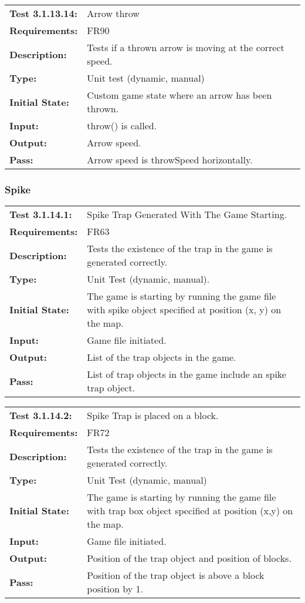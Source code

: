 \documentclass[12pt, titlepage]{article}
\begin{document}
\textcolor{red}{
\begin{tabular}{|l|p{10cm}|}
    \hline
    \bf{Test} 3.1.13.14: & Arrow throw \\
    \bf{Requirements}: & FR90 \\
    \bf{Description}: & Tests if a thrown arrow is moving at the correct speed. \\
    \bf{Type}: & Unit test (dynamic, manual) \\
    \bf{Initial State}: & Custom game state where an arrow has been thrown. \\
    \bf{Input}: & throw() is called. \\
    \bf{Output}: & Arrow speed. \\
    \bf{Pass}: & Arrow speed is throwSpeed horizontally. \\
    \hline
\end{tabular}
}

\subsubsection{Spike}

\begin{tabular}{|l|p{10cm}|}
    \hline
    \bf{Test} 3.1.14.1: & Spike Trap Generated With The Game Starting. \\
    \bf{Requirements}: & FR63\\
    \bf{Description}: & Tests the existence of the trap in the game is generated correctly. \\
    \bf{Type}: & Unit Test (dynamic, manual). \\
    \bf{Initial State}: & The game is starting by running the game file with spike object specified at position (x, y) on the map. \\
    \bf{Input}: & Game file initiated.\\
    \bf{Output}: & List of the trap objects in the game.\\
    \bf{Pass}: & List of trap objects in the game include an spike trap object.\\
    \hline
\end{tabular}

\begin{tabular}{|l|p{10cm}|}
    \hline
    \bf{Test} 3.1.14.2: & Spike Trap is placed on a block.\\
    \bf{Requirements}: & FR72\\
    \bf{Description}: & Tests the existence of the trap in the game is generated correctly.\\
    \bf{Type}: & Unit Test (dynamic, manual) \\
    \bf{Initial State}: & The game is starting by running the game file with trap box object specified at position (x,y) on the map.\\
    \bf{Input}: & Game file initiated.\\
    \bf{Output}: & Position of the trap object and position of blocks.\\
    \bf{Pass}: & Position of the trap object is above a block position by 1.\\
    \hline
\end{tabular}
\end{document}
